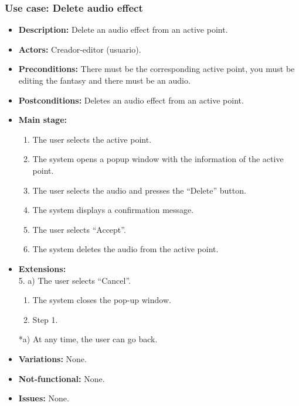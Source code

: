 \subsubsection{Use case: Delete audio effect}
\begin{itemize}
	\item \textbf{Description:} Delete an audio effect from an active point.
	\item \textbf{Actors:} Creador-editor (usuario).
	\item \textbf{Preconditions:} There must be the corresponding active point, you must be editing the fantasy and there must be an audio.
	\item \textbf{Postconditions:} Deletes an audio effect from an active point.
	\item \textbf{Main stage:}
	\begin{enumerate}
		\item The user selects the active point.
		\item The system opens a popup window with the information of the active point.
		\item The user selects the audio and presses the ``Delete'' button.
		\item The system displays a confirmation message.
		\item The user selects ``Accept''.
		\item The system deletes the audio from the active point.
	\end{enumerate}
	\item \textbf{Extensions:} \\ 5. a) The user selects ``Cancel''.
	\begin{enumerate}
		\item The system closes the pop-up window.
		\item Step 1.
	\end{enumerate}
	*a) At any time, the user can go back.
	\item \textbf{Variations:} None.
	\item \textbf{Not-functional:} None.
	\item \textbf{Issues:} None.
\end{itemize}


